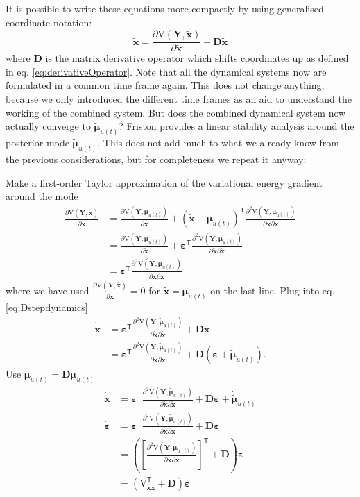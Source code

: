 \documentclass[a4paper,10pt]{article}
\newcommand{\bs}[1]{\mathbf{#1}}					%
\newcommand{\bgs}[1]{\boldsymbol{#1}}				%
\newcommand{\pd}[2]{\frac{\partial #1}{\partial #2}} 	%
\newcommand{\ppd}[3]{\frac{\partial^2 #1}{\partial #2 \partial #3}} %
\newcommand{\tr}{\mathsf{T}}				%
\newcommand{\eq}[1]{\begin{equation} #1 \end{equation}}%
\newcommand{\gc}[1]{\tilde{#1}} %
\renewcommand{\ss}{u}         %
\newcommand{\sh}{x}         %
\newcommand{\spm}{\mu}    %
\newcommand{\ph}{\bs{\sh}}    %
\newcommand{\ppm}{\bgs{\spm}}   %
\newcommand{\phg}{\gc{\ph}}    %
\newcommand{\ppmg}{\gc{\ppm}} %
\newcommand{\Po}{\bs{Y}}    %
\newcommand{\D}{\bs{D}}				%
\newcommand{\V}{\mathrm{V}}			%
\begin{document}
It is possible to write these equations more compactly by using generalised coordinate notation:
\eq{\label{eq:Dstepdynamics}
    \dot{\phg} = \pd{\V(\Po,\phg)}{\phg} + \D\phg
}
where $\D$ is the matrix derivative operator which shifts coordinates up as defined in eq. \eqref{eq:derivativeOperator}. Note that all the dynamical systems now are formulated in a common time frame again. This does not change anything, because we only introduced the different time frames as an aid to understand the working of the combined system. But does the combined dynamical system now actually converge to $\ppmg_{\ss(t)}$? Friston provides a linear stability analysis around the posterior mode $\ppmg_{\ss(t)}$. This does not add much to what we already know from the previous considerations, but for completeness we repeat it anyway:

Make a first-order Taylor approximation of the variational energy gradient around the mode
\eq{\begin{split}
    \pd{\V(\Po,\phg)}{\phg} &= \pd{\V(\Po,\ppmg_{\ss(t)})}{\phg} + (\phg - \ppmg_{\ss(t)})^\tr \ppd{\V(\Po,\ppmg_{\ss(t)})}{\phg}{\phg}\\
    &= \pd{\V(\Po,\ppmg_{\ss(t)})}{\phg} + \bgs{\varepsilon}^\tr \ppd{\V(\Po,\ppmg_{\ss(t)})}{\phg}{\phg}\\
    &=\bgs{\varepsilon}^\tr \ppd{\V(\Po,\ppmg_{\ss(t)})}{\phg}{\phg}
\end{split}}
where we have used $\pd{\V(\Po,\phg)}{\phg} = 0$ for $\phg = \ppmg_{\ss(t)}$ on the last line. Plug into eq. \eqref{eq:Dstepdynamics}
\eq{\begin{split}
    \dot{\phg} &= \bgs{\varepsilon}^\tr \ppd{\V(\Po,\ppmg_{\ss(t)})}{\phg}{\phg} + \D\phg\\
   &= \bgs{\varepsilon}^\tr \ppd{\V(\Po,\ppmg_{\ss(t)})}{\phg}{\phg} + \D (\bgs{\varepsilon} + \ppmg_{\ss(t)}).
\end{split}}
Use $\dot{\ppmg}_{\ss(t)} = \D\ppmg_{\ss(t)}$
\begin{align}
    \dot{\phg} &= \bgs{\varepsilon}^\tr \ppd{\V(\Po,\ppmg_{\ss(t)})}{\phg}{\phg} + \D\bgs{\varepsilon} + \dot{\ppmg}_{\ss(t)}\\
    \dot{\bgs{\varepsilon}} &= \bgs{\varepsilon}^\tr \ppd{\V(\Po,\ppmg_{\ss(t)})}{\phg}{\phg} + \D\bgs{\varepsilon}\\
    &= \left(\left[\ppd{\V(\Po,\ppmg_{\ss(t)})}{\phg}{\phg}\right]^\tr + \D\right) \bgs{\varepsilon}\\
    &= \left(\V_{\phg\phg}^\tr + \D\right) \bgs{\varepsilon}
\end{align}
\end{document}
